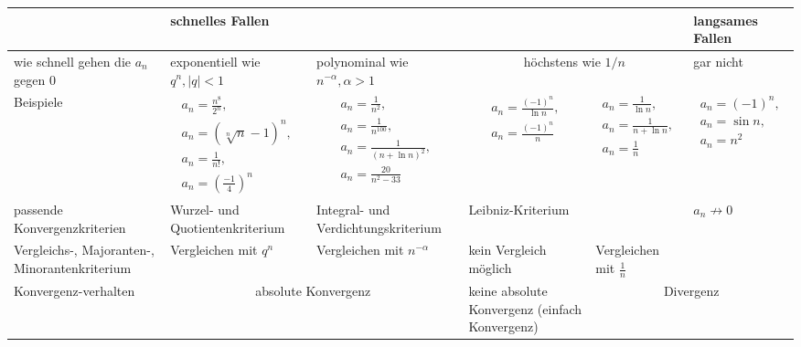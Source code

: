 {\footnotesize
\begin{tabular}{|p{2cm}||p{3cm}|p{3cm}|p{3cm}|p{3cm}|p{3cm}|}
\hline & \multicolumn{4}{l}{schnelles Fallen} & langsames Fallen \\
\hline
 
wie schnell gehen die $a_n$ gegen 0 & exponentiell wie $q^n, |q| < 1$ &
polynominal wie $n^{-\alpha}, \alpha > 1$ & \multicolumn{2}{|c|}{höchstens wie
$1/n$} & gar nicht \\ \hline

Beispiele & \begin{align*} a_n = \frac{n^8}{2^n},\\ a_n =
(\sqrt[n]{n} - 1)^n,\\
a_n = \frac{1}{n!},\\ a_n = \left( \frac{-1}{4}\right)^n \end{align*} &
\begin{align*} a_n = \frac{1}{n^2}, \\ a_n = \frac{1}{n^{100}}, \\ a_n =
\frac{1}{(n + \ln n)^2}, \\ a_n = \frac{20}{n^2 - 33} \end{align*} &
\begin{align*} a_n = \frac{(-1)^n}{\ln n}, \\ a_n = \frac{(-1)^n}{n}
\end{align*} & \begin{align*} a_n = \frac{1}{\ln n}, \\ a_n = \frac{1}{n + \ln
n}, \\ a_n = \frac{1}{n} \end{align*} & \begin{align*} a_n = (-1)^n, \\ a_n =
\sin n, \\ a_n = n^2 \end{align*}\\ \hline

passende Konvergenzkriterien & Wurzel- und Quotientenkriterium & Integral- und
Verdichtungskriterium & Leibniz-Kriterium & & $a_n \not\to 0$ \\ \hline

Vergleichs-, Majoranten-, Minorantenkriterium & Vergleichen mit $q^n$ &
Vergleichen mit $n^{-\alpha}$ & kein Vergleich möglich & Vergleichen mit
$\frac{1}{n}$ & \\ \hline

Konvergenz-verhalten & \multicolumn{2}{c|}{absolute Konvergenz} & keine
absolute Konvergenz (einfach Konvergenz) & \multicolumn{2}{|c|}{Divergenz} \\
\hline

\end{tabular}
}


